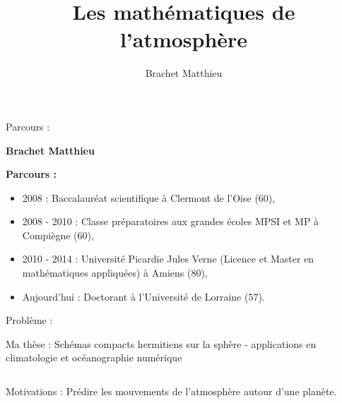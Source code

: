 \documentclass[11pt]{beamer}
\author{Brachet Matthieu}
\title{Les mathématiques de l'atmosphère}
\begin{document}
\begin{frame}
\titlepage
\end{frame}

\begin{frame}{Parcours :}

\textbf{Brachet Matthieu}

\vspace{1cm}
\textbf{Parcours : }
\begin{itemize}
\item 2008 : Baccalauréat scientifique à Clermont de l'Oise (60), \pause
\item 2008 - 2010 : Classe préparatoires aux grandes écoles MPSI et MP à Compiègne (60), \pause
\item 2010 - 2014 : Université Picardie Jules Verne (Licence et Master en mathématiques appliquées) à Amiens (80), \pause
\item Aujourd'hui : Doctorant à l'Université de Lorraine (57). 
\end{itemize}

\end{frame}


\begin{frame}{Problème :}

\begin{block}{Ma thèse :}
Schémas compacts hermitiens sur la sphère - applications en climatologie et océanographie numérique
\end{block}

\begin{columns}
\begin{block}{Motivations :}
Prédire les mouvements de l'atmosphère autour d'une planète.
\end{block}

\end{columns}
\end{frame}

\end{document}
